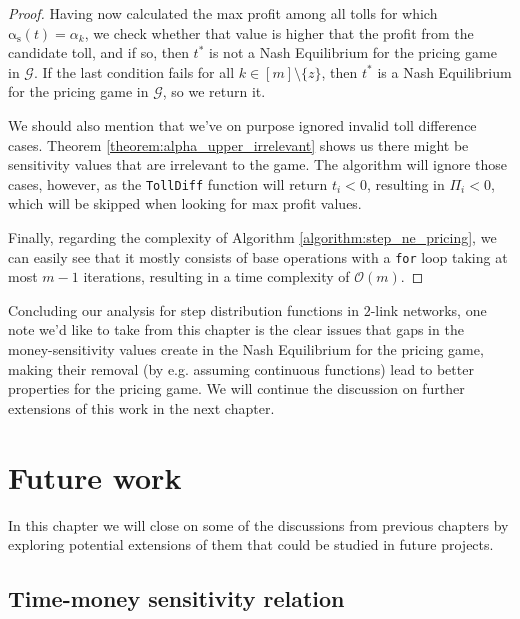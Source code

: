 \documentclass[10pt,a4paper]{book}
\newcommand{\as}{\mathrm{\alpha_s}}
\newcommand{\Gm}{\mathcal{G}}
\theoremstyle{definition}
\theoremstyle{comment}
\begin{document}
\begin{proof}
	Having now calculated the max profit among all tolls for which $\as(t) = \alpha_k$, we check whether that value is higher that the profit from the candidate toll, and if so, then $t^*$ is not a Nash Equilibrium for the pricing game in $\Gm$.
	If the last condition fails for all $k \in [m] \setminus \{z\}$, then $t^*$ is a Nash Equilibrium for the pricing game in $\Gm$, so we return it.

	We should also mention that we've on purpose ignored invalid toll difference cases.
	Theorem \ref{theorem:alpha_upper_irrelevant} shows us there might be sensitivity values that are irrelevant to the game.
	The algorithm will ignore those cases, however, as the \texttt{TollDiff} function will return $t_i < 0$, resulting in $\Pi_i < 0$, which will be skipped when looking for max profit values.

	Finally, regarding the complexity of Algorithm \ref{algorithm:step_ne_pricing}, we can easily see that it mostly consists of base operations with a \texttt{for} loop taking at most $m - 1$ iterations, resulting in a time complexity of $\mathcal{O}(m)$.
\end{proof}

Concluding our analysis for step distribution functions in $2$-link networks, one note we'd like to take from this chapter is the clear issues that gaps in the money-sensitivity values create in the Nash Equilibrium for the pricing game, making their removal (by e.g. assuming continuous functions) lead to better properties for the pricing game.
We will continue the discussion on further extensions of this work in the next chapter.

\cleardoublepage


\chapter{Future work}
\label{chapter:future_work}

In this chapter we will close on some of the discussions from previous chapters by exploring potential extensions of them that could be studied in future projects.

\section*{Time-money sensitivity relation}
\end{document}
